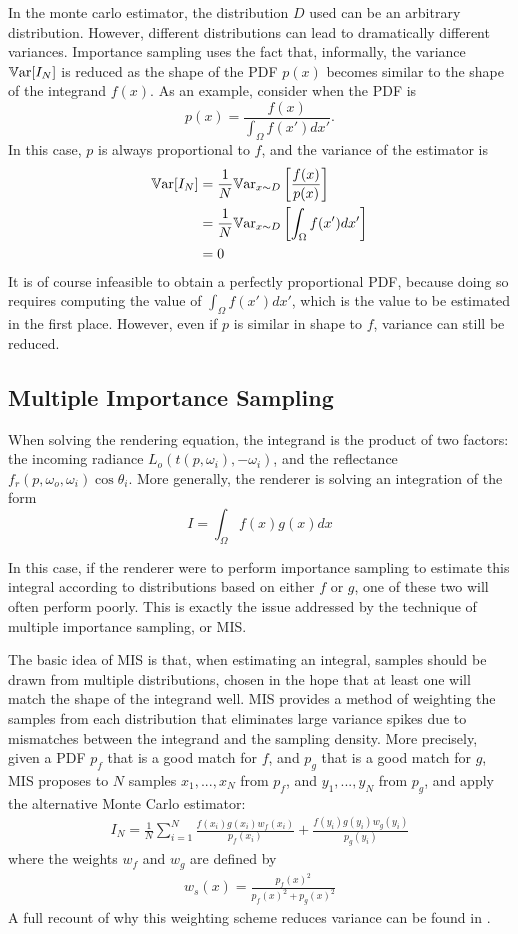 In the monte carlo estimator, the distribution $D$ used can be an arbitrary distribution. However, different distributions can lead to dramatically different variances. Importance sampling uses the fact that, informally, the variance $\mathbb{V}\text{ar}[I_N]$ is reduced as the shape of the PDF $p(x)$ becomes similar to the shape of the integrand $f(x)$. As an example, consider when the PDF is 
$$ 
p(x)=\frac{f(x)}{\int_\Omega f(x') dx'}.
$$ 
In this case, $p$ is always proportional to $f$, and the variance of the estimator is
\begin{align*}
\mathbb{V}\text{ar}[I_N]
&= \frac{1}{N}\mathbb{V}\text{ar}_{x\sim D}\left[\frac{f(x)}{p(x)}\right]\\
&= \frac{1}{N}\mathbb{V}\text{ar}_{x\sim D}\left[\int_\Omega f(x') dx'\right]\\
&=0
\end{align*}
It is of course infeasible to obtain a perfectly proportional PDF, because doing so requires computing the value of $\int_\Omega f(x') dx'$, which is the value to be estimated in the first place. However, even if $p$ is similar in shape to $f$, variance can still be reduced.

\subsection{Multiple Importance Sampling}
\label{subsection MIS}
When solving the rendering equation, the integrand is the product of two factors: the incoming radiance $L_o(t(p,\omega_i),-\omega_i)$, and the reflectance $f_r(p,\omega_o,\omega_i)\cos\theta_i$. More generally, the renderer is solving an integration of the form
$$
I = \int_\Omega f(x)g(x)dx
$$

In this case, if the renderer were to perform importance sampling to estimate this integral according to distributions based on either $f$ or $g$, one of these two will often perform poorly\cite{pharr2016physically}. This is exactly the issue addressed by the technique of multiple importance sampling, or MIS.

The basic idea of MIS is that, when estimating an integral, samples should be drawn from multiple distributions, chosen in the hope that at least one will match the shape of the integrand well. MIS provides a method of weighting the samples from each distribution that eliminates large variance spikes due to mismatches between the integrand and the sampling density. More precisely, given a PDF $p_f$ that is a good match for $f$, and $p_g$ that is a good match for $g$, MIS proposes to $N$ samples $x_1,...,x_N$ from $p_f$, and $y_1,...,y_N$ from $p_g$, and apply the alternative Monte Carlo estimator:
\begin{align}
    I_N = \frac{1}{N} \sum_{i=1}^{N} \frac{f(x_i)g(x_i)w_f(x_i)}{p_f(x_i)} + \frac{f(y_i)g(y_i)w_g(y_i)}{p_g(y_i)}
    \label{MIS}
\end{align}
where the weights $w_f$ and $w_g$ are defined by
\begin{align*}
    w_s(x) = \frac{p_f(x)^2}{p_f(x)^2+p_g(x)^2}
\end{align*}
A full recount of why this weighting scheme reduces variance can be found in \cite{pharr2016physically}. 


